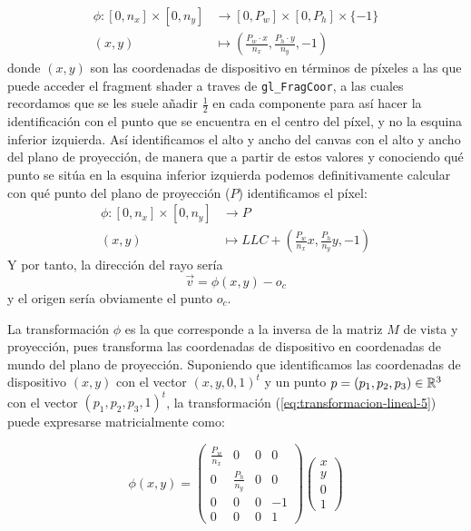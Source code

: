 \begin{equation}
    \label{eq:transformacion-lineal-4}
    \begin{split}
        \phi : [0,n_x]\times [0,n_y] & \longrightarrow [0,P_w]\times[0,P_h]\times \{-1\} \\
        (x,y) & \longmapsto \left(\frac{P_w\cdot x}{n_x},\frac{P_h\cdot y}{n_y},-1\right)
    \end{split}
\end{equation}
donde $(x,y)$ son las coordenadas de dispositivo en términos de píxeles a las que puede acceder el fragment shader a traves de \verb|gl_FragCoor|, a las cuales recordamos que se les suele añadir $\frac{1}{2}$ en cada componente para así hacer la identificación con el punto que se encuentra en el centro del píxel, y no la esquina inferior izquierda. Así identificamos el alto y ancho del canvas con el alto y ancho del plano de proyección, de manera que a partir de estos valores y conociendo qué punto se sitúa en la esquina inferior izquierda podemos definitivamente calcular con qué punto del plano de proyección ($P$) identificamos el píxel:
\begin{equation}
    \label{eq:transformacion-lineal-5}
    \begin{split}
        \phi : [0,n_x]\times [0,n_y] & \longrightarrow P \\
        (x,y) & \longmapsto LLC + \left(\frac{P_w}{n_x}x,\frac{P_h}{n_y}y,-1\right)
    \end{split}
\end{equation}
Y por tanto, la dirección del rayo sería
$$
\vec v = \phi(x,y) - o_c
$$
y el origen sería obviamente el punto $o_c$.

La transformación $\phi$ es la que corresponde a la inversa de la matriz $M$ de vista y proyección, pues transforma las coordenadas de dispositivo en coordenadas de mundo del plano de proyección. Suponiendo que identificamos las coordenadas de dispositivo $(x,y)$ con el vector $(x,y,0,1)^t$ y un punto $p=(p_1,p_2,p_3)\in\mathbb{R}^3$ con el vector $(p_1,p_2,p_3,1)^t$, la transformación (\ref{eq:transformacion-lineal-5}) puede expresarse matricialmente como:

\begin{equation}
    \label{eq:transformacion-lineal-matrix-3D-base}
    \phi(x,y) = \left(\begin{array}{ccc|c}
        \frac{P_w}{n_x} & 0 & 0 & 0 \\
        0 & \frac{P_h}{n_y} & 0 & 0 \\
        0 & 0 & 0 & -1 \\ \hline
        0 & 0 & 0 & 1
    \end{array}\right)\left(
        \begin{array}{c}
            x \\ y \\ 0 \\ \hline 1
        \end{array}\right)
\end{equation}

